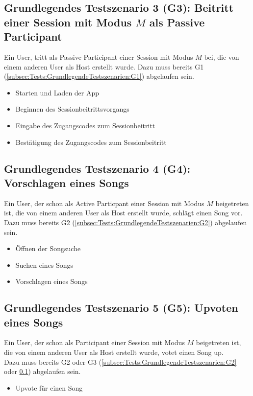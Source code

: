 \documentclass[oneside, ngerman]{sdqtechreport}
\begin{document}
\subsection{Grundlegendes Testszenario 3 (G3): Beitritt einer Session mit Modus $M$ als Passive Participant}
\label{subsec:Tests:GrundlegendeTestszenarien:G3}
Ein User, tritt als Passive Participant einer Session mit Modus $M$ bei, die von einem anderen User als Host erstellt wurde.
Dazu muss bereits G1 (\ref{subsec:Tests:GrundlegendeTestszenarien:G1}) abgelaufen sein.
\begin{itemize}
    \item Starten und Laden der App
    \item Beginnen des Sessionbeitrittsvorgangs
    \item Eingabe des Zugangscodes zum Sessionbeitritt
    \item Bestätigung des Zugangscodes zum Sessionbeitritt
\end{itemize}

\subsection{Grundlegendes Testszenario 4 (G4): Vorschlagen eines Songs}
\label{subsec:Tests:GrundlegendeTestszenarien:G4}
Ein User, der schon als Active Particpant einer Session mit Modus $M$ beigetreten ist, die von einem anderen User als Host erstellt wurde, schlägt einen Song vor. \\
Dazu muss bereits G2 (\ref{subsec:Tests:GrundlegendeTestszenarien:G2}) abgelaufen sein.
\begin{itemize}
    \item Öffnen der Songsuche
    \item Suchen eines Songs
    \item Vorschlagen eines Songs
\end{itemize}

\subsection{Grundlegendes Testszenario 5 (G5): Upvoten eines Songs}
\label{subsec:Tests:GrundlegendeTestszenarien:G5}
Ein User, der schon als Participant einer Session mit Modus $M$ beigetreten ist, die von einem anderen User als Host erstellt wurde, votet einen Song up. \\
Dazu muss bereits G2 oder G3 (\ref{subsec:Tests:GrundlegendeTestszenarien:G2} oder \ref{subsec:Tests:GrundlegendeTestszenarien:G3}) abgelaufen sein.
\begin{itemize}
    \item Upvote für einen Song
\end{itemize}
\end{document}
